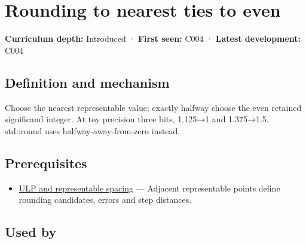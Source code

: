 \hypertarget{appendix-614afe1de592}{}\label{referencestart:appendix-614afe1de592}
\section{Rounding to nearest ties to even}\label{appendix-614afe1de592-rounding-to-nearest-ties-to-even}

\textbf{Curriculum depth:} Introduced · \textbf{First seen:} C004 · \textbf{Latest development:} C004

\begin{allmightroledefinition}

\subsection{Definition and mechanism}\label{appendix-614afe1de592-definition-and-mechanism}

Choose the nearest representable value; exactly halfway choose the even retained significand integer. At toy precision three bits, 1.125→1 and 1.375→1.5. std::round uses halfway-away-from-zero instead.

\end{allmightroledefinition}

\subsection{Prerequisites}\label{appendix-614afe1de592-prerequisites}

\begin{itemize}
\tightlist
\item
  \hyperref[appendix-14bab4cab9d4]{ULP and representable spacing} --- Adjacent representable points define rounding candidates, errors and step distances.
\end{itemize}

\subsection{Used by}\label{appendix-614afe1de592-used-by}

